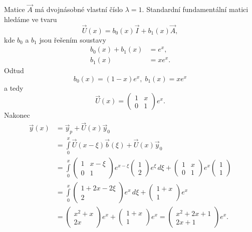 \begin{sol}
   Matice $\vec{A}$ má dvojnásobné vlastní číslo $\lambda=1$.
   Standardní fundamentální matici hledáme ve tvaru
   \[
      \vec{U}(x) = b_0(x)\vec{I} + b_1(x)\vec{A},
   \]
   kde $b_0$ a $b_1$ jsou řešením soustavy
   \[
      \begin{split}
         b_0(x) + b_1(x) &= e^{x},\\
                  b_1(x) &= xe^{x}.
      \end{split}
   \]
   Odtud
   \[
      b_0(x) = (1-x)e^x, \; b_1(x) = xe^x
   \]
   a tedy
   \[
      \vec{U}(x) = \begin{pmatrix}1&x\\0&1\end{pmatrix}e^x.
   \]
   Nakonec
   \[
     \begin{split}
        \vec{y}(x) &= \vec{y}_p + \vec{U}(x)\vec{y}_0\\
                   &= \int\limits_0^x\vec{U}(x-\xi)\vec{b}(\xi)+\vec{U}(x)\vec{y}_0\\
                   &= \int\limits_0^x
                         \begin{pmatrix}1&x-\xi\\0&1\end{pmatrix}e^{x-\xi}
                         \begin{pmatrix}1 \\ 2\end{pmatrix}e^{\xi}\,d\xi
                    +\begin{pmatrix}1&x\\0&1\end{pmatrix}e^x
                        \begin{pmatrix}
                        1\\1
                        \end{pmatrix}\\
                   &= \int\limits_0^x
                         \begin{pmatrix}1+2x-2\xi\\2\end{pmatrix}e^{x}
                         \,d\xi
                    +\begin{pmatrix}1+x\\1\end{pmatrix}e^x\\
                   &= 
                     \begin{pmatrix}x^2+x\\2x\end{pmatrix}e^{x}
                    +\begin{pmatrix}1+x\\1\end{pmatrix}e^x
                   = 
                     \begin{pmatrix}x^2+2x+1\\2x+1\end{pmatrix}e^{x}.
     \end{split}
   \]
\end{sol}



